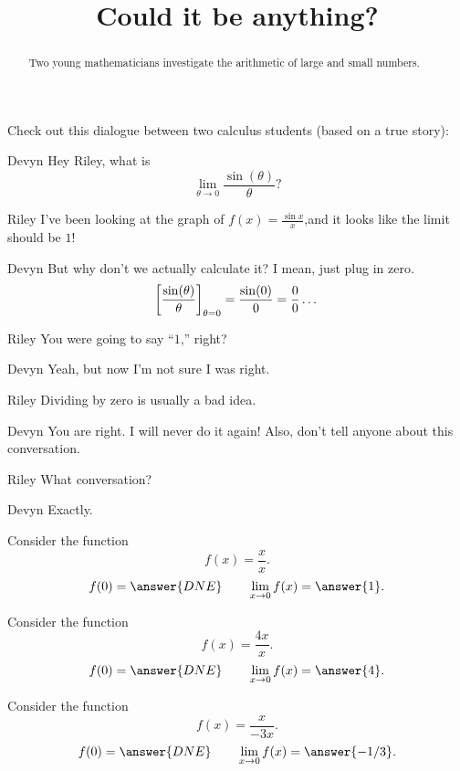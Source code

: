 \documentclass{ximera}
\title[Break-Ground:]{Could it be anything?}
\begin{document}
\begin{abstract}
Two young mathematicians investigate the arithmetic of large
and small numbers.
\end{abstract}
\maketitle


Check out this dialogue between two calculus students (based on a true
story):


\begin{dialogue}
\item[Devyn] Hey Riley, what is
  \[
  \lim_{\theta\to 0}\frac{\sin(\theta)}{\theta}?
  \]
\item[Riley] I've been looking at the graph of $f(x) = \frac{\sin x}{x}$,and it looks like the limit should be $1$!
\item[Devyn] But why don't we actually calculate it? I mean, just plug in zero. 
  \[
  \bigg[ \frac{\sin(\theta)}{\theta} \bigg]_{\theta=0} = \frac{\sin(0)}{0}=\frac{0}{0}\dots
  \]
  \item[Riley] You were going to say ``$1$,'' right? 
  \item[Devyn] Yeah, but now I'm not sure I was right.
  \item[Riley] Dividing by zero is usually a bad idea.
  \item[Devyn] You are right. I will never do it again! Also, don't
    tell anyone about this conversation.
  \item[Riley] What conversation?
  \item[Devyn] Exactly.
\end{dialogue}



\begin{problem}
  Consider the function
  \[
  f(x) = \frac{x}{x}.
  \]
  \[
  f(0) = \answer{DNE}\qquad\lim_{x\to 0} f(x) = \answer{1}.
  \]
\end{problem}

\begin{problem}
  Consider the function
  \[
  f(x) = \frac{4x}{x}.
  \]
  \[
  f(0) = \answer{DNE}\qquad\lim_{x\to 0} f(x) = \answer{4}.
  \]
\end{problem}

\begin{problem}
  Consider the function
  \[
  f(x) = \frac{x}{-3x}.
  \]
  \[
  f(0) = \answer{DNE}\qquad\lim_{x\to 0} f(x) = \answer{-1/3}.
  \]
\end{problem}


\end{document}
